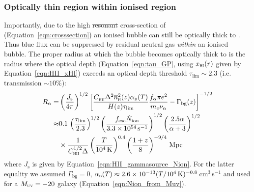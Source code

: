 \documentclass[fleqn,usenatbib]{mnras}
\providecommand{\DIFadd}[1]{{\protect\color{Green} {\bf #1}}} %
\providecommand{\DIFdel}[1]{{\protect\color{Gray} \scriptsize \sout{#1}}} %
\providecommand{\DIFaddbegin}{} %
\providecommand{\DIFaddend}{} %
\providecommand{\DIFdelbegin}{} %
\providecommand{\DIFdelend}{} %
\newcommand{\DIFscaledelfig}{0.5}
\newlength{\DIFdelgraphicswidth} %
\newlength{\DIFdelgraphicsheight} %
\newcommand{\DIFaddincludegraphics}[2][]{{\color{purple}\fbox{\DIFOincludegraphics[#1]{#2}}}} %
\newcommand{\DIFdelincludegraphics}[2][]{%
\sbox{\DIFdelgraphicsbox}{\DIFOincludegraphics[#1]{#2}}%
\settoboxwidth{\DIFdelgraphicswidth}{\DIFdelgraphicsbox} %
\settoboxtotalheight{\DIFdelgraphicsheight}{\DIFdelgraphicsbox} %
\scalebox{\DIFscaledelfig}{%
\parbox[b]{\DIFdelgraphicswidth}{\usebox{\DIFdelgraphicsbox}\\[-\baselineskip] \rule{\DIFdelgraphicswidth}{0em}}\llap{\resizebox{\DIFdelgraphicswidth}{\DIFdelgraphicsheight}{%
\setlength{\unitlength}{\DIFdelgraphicswidth}%
\begin{picture}(1,1)%
\thicklines\linethickness{2pt} %
{\color[rgb]{1,0,0}\put(0,0){\framebox(1,1){}}}%
{\color[rgb]{1,0,0}\put(0,0){\line( 1,1){1}}}%
{\color[rgb]{1,0,0}\put(0,1){\line(1,-1){1}}}%
\end{picture}%
}\hspace*{3pt}}} %
} %
\DeclareRobustCommand{\DIFaddbegin}{\DIFOaddbegin \let\includegraphics\DIFaddincludegraphics} %
\DeclareRobustCommand{\DIFaddend}{\DIFOaddend \let\includegraphics\DIFOincludegraphics} %
\DeclareRobustCommand{\DIFdelbegin}{\DIFOdelbegin \let\includegraphics\DIFdelincludegraphics} %
\DeclareRobustCommand{\DIFdelend}{\DIFOaddend \let\includegraphics\DIFOincludegraphics} %
\begin{document}
\subsubsection{Optically thin region within ionised region}
\label{sec:model_thinregion}

Importantly, due to the high \DIFdelbegin \DIFdel{resonant }\DIFdelend cross-section of \lya\DIFaddbegin \DIFadd{\ for scattering around the resonant wavelength }\DIFaddend (Equation~\eqref{eqn:crosssection}) an ionised bubble can still be optically thick to \lya. Thus blue \lya flux can be suppressed by residual neutral gas \textit{within} an ionised bubble. The proper radius at which the bubble becomes optically thick to \lya is the radius where the \citet{Gunn1965} optical depth (Equation~\eqref{eqn:tau_GP}, using $\xHI(r)$ given by Equation~\ref{eqn:HII_xHI}) exceeds an optical depth threshold $\tau_\mathrm{lim}\sim 2.3$ (i.e. transmission $\sim10$\%):
%
\DIFdelbegin %
\DIFdelend \DIFaddbegin \begin{align} \label{eqn:opticallythin}
%
R_\alpha =& \left(\frac{J_\mathrm{s}}{4\pi}\right)^{1/2} \left[ \frac{ \clump \Delta^2 \nh[2](z) \alpha_\textsc{b}(T)}{H(z) \tau_\mathrm{lim}}\frac{f_\alpha \pi e^2}{m_e \nu_\alpha} - \Gamma_\textrm{bg}(z) \right]^{-1/2} \\
%
\approx& 0.1 \, \left(\frac{\tau_\mathrm{lim}}{2.3}\right)^{1/2} \left(\frac{\fesc\Nion}{3.3 \times 10^{54}\,\mathrm{s}^{-1}}\right)^{1/2}  \left(\frac{2.5\alpha}{\alpha+3}\right)^{1/2} \nonumber \\
&\times \frac{1}{C_\textsc{hii}^{1/2}\Delta} \left(\frac{T}{10^4\,\mathrm{K}}\right)^{0.4} \left(\frac{1+z}{8}\right)^{-9/4} \,\mathrm{Mpc} \nonumber
%
\end{align}
\DIFaddend %
where $J_\mathrm{s}$ is given by Equation~\eqref{eqn:HII_gammasource_Nion}.
For the latter equality we assumed $\Gamma_\mathrm{bg} = 0$, $\alpha_\textsc{b}(T) \approx 2.6\times10^{-13}(T/10^4\,\mathrm{K})^{-0.8}$\,cm$^3$\,s$^{-1}$ and used \Nion for a $\MUV = -20$ galaxy (Equation~\ref{eqn:Nion_from_Muv}).
\end{document}

